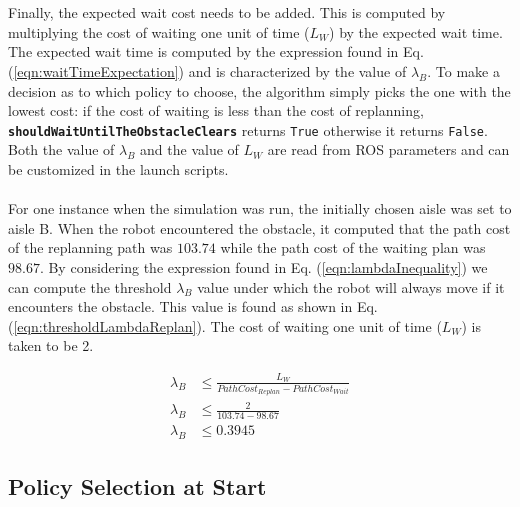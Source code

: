 \documentclass[a4paper,12pt]{article}
\begin{document}
		\\
		\\
		Finally, the expected wait cost needs to be added. This is computed by multiplying the cost of waiting one unit of time ($L_W$) by the expected wait time. The expected wait time is computed by the expression found in Eq. (\ref{eqn:waitTimeExpectation}) and is characterized by the value of $\lambda_B$. To make a decision as to which policy to choose, the algorithm simply picks the one with the lowest cost: if the cost of waiting is less than the cost of replanning, \textbf{\texttt{shouldWaitUntilTheObstacleClears}} returns \texttt{True} otherwise it returns \texttt{False}. Both the value of $\lambda_B$ and the value of $L_W$ are read from ROS parameters and can be customized in the launch scripts.
		\\
		\\
		For one instance when the simulation was run, the initially chosen aisle was set to aisle B. When the robot encountered the obstacle, it computed that the path cost of the replanning path was $103.74$ while the path cost of the waiting plan was $98.67$. By considering the expression found in Eq. (\ref{eqn:lambdaInequality}) we can compute the threshold $\lambda_B$ value under which the robot will always move if it encounters the obstacle. This value is found as shown in Eq. (\ref{eqn:thresholdLambdaReplan}). The cost of waiting one unit of time ($L_W$) is taken to be 2.
		
		\begin{equation}
		\begin{split}
			\lambda_B &\leq \frac{L_W}{PathCost_{Replan} - PathCost_{Wait}} \\
			\lambda_B &\leq \frac{2}{103.74 - 98.67} \\
			\lambda_B &\leq 0.3945
			\end{split}
		\label{eqn:thresholdLambdaReplan}
		\end{equation}
	
	\subsection{Policy Selection at Start}
	\label{sec:policySelectionAtStartROS}
	
\end{document}
